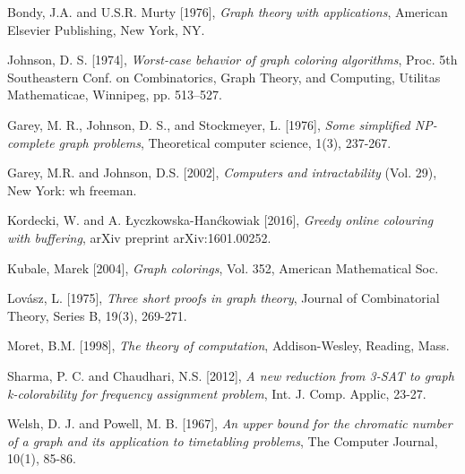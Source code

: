 \documentclass{article}
\theoremstyle{definition}
\begin{document}
\begin{thebibliography}{9}
Bondy, J.A. and U.S.R. Murty [1976],
\emph{Graph theory with applications},
American Elsevier Publishing, New York, NY.

Johnson, D. S. [1974], \emph{Worst-case behavior of graph coloring algorithms}, Proc. 5th Southeastern Conf. on Combinatorics, Graph Theory, and Computing, Utilitas Mathematicae, Winnipeg, pp. 513–527.

Garey, M. R., Johnson, D. S., and Stockmeyer, L. [1976], \emph{Some simplified NP-complete graph problems}, Theoretical computer science, 1(3), 237-267.

Garey, M.R. and Johnson, D.S. [2002], \emph{Computers and intractability} (Vol. 29), New York: wh freeman.

Kordecki, W. and A. Łyczkowska-Hanćkowiak [2016], \emph{Greedy online colouring with buffering}, arXiv preprint arXiv:1601.00252.

Kubale, Marek [2004], \emph{Graph colorings}, Vol. 352, American Mathematical Soc.

Lovász, L. [1975], \emph{Three short proofs in graph theory}, Journal of Combinatorial Theory, Series B, 19(3), 269-271.

Moret, B.M. [1998], \emph{The theory of computation}, Addison-Wesley, Reading, Mass.

Sharma, P. C. and Chaudhari, N.S. [2012], \emph{A new reduction from 3-SAT to graph k-colorability for frequency assignment problem}, Int. J. Comp. Applic, 23-27.

Welsh, D. J. and Powell, M. B. [1967], \emph{An upper bound for the chromatic number of a graph and its application to timetabling problems}, The Computer Journal, 10(1), 85-86.

\end{thebibliography}
\end{document}
